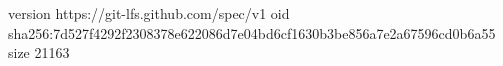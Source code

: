 version https://git-lfs.github.com/spec/v1
oid sha256:7d527f4292f2308378e622086d7e04bd6cf1630b3be856a7e2a67596cd0b6a55
size 21163

